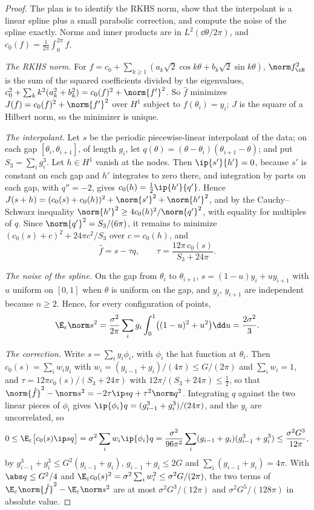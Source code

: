 \begin{refsection}
\begin{proof}
The plan is to identify the RKHS norm, show that the interpolant is a linear spline plus a small parabolic correction, and compute the noise of the spline exactly. Norms and inner products are in $L^2(\dd\theta/2\pi)$, and $c_0(f)=\frac1{2\pi}\int_0^{2\pi}f$.

\emph{The RKHS norm.} For $f=c_0+\sum_{k\ge1}(a_k\sqrt2\cos k\theta+b_k\sqrt2\sin k\theta)$, $\norm f_\cH^2$ is the sum of the squared coefficients divided by the eigenvalues, $c_0^2+\sum_kk^2(a_k^2+b_k^2)=c_0(f)^2+\norm{f'}^2$. So $\hat f$ minimizes $J(f)=c_0(f)^2+\norm{f'}^2$ over $H^1$ subject to $f(\theta_i)=y_i$; $J$ is the square of a Hilbert norm, so the minimizer is unique.

\emph{The interpolant.} Let $s$ be the periodic piecewise-linear interpolant of the data; on each gap $[\theta_i,\theta_{i+1}]$, of length $g_i$, let $q(\theta)=(\theta-\theta_i)(\theta_{i+1}-\theta)$; and put $S_3=\sum_ig_i^3$. Let $h\in H^1$ vanish at the nodes. Then $\ip{s'}{h'}=0$, because $s'$ is constant on each gap and $h'$ integrates to zero there, and integration by parts on each gap, with $q''=-2$, gives $c_0(h)=\frac12\ip{h'}{q'}$. Hence $J(s+h)=(c_0(s)+c_0(h))^2+\norm{s'}^2+\norm{h'}^2$, and by the Cauchy--Schwarz inequality $\norm{h'}^2\ge4c_0(h)^2/\norm{q'}^2$, with equality for multiples of $q$. Since $\norm{q'}^2=S_3/(6\pi)$, it remains to minimize $(c_0(s)+c)^2+24\pi c^2/S_3$ over $c=c_0(h)$, and
\[
\hat f=s-\tau q,\qquad\tau=\frac{12\pi\,c_0(s)}{S_3+24\pi}.
\]

\emph{The noise of the spline.} On the gap from $\theta_i$ to $\theta_{i+1}$, $s=(1-u)y_i+uy_{i+1}$ with $u$ uniform on $[0,1]$ when $\theta$ is uniform on the gap, and $y_i$, $y_{i+1}$ are independent because $n\ge2$. Hence, for every configuration of points,
\[
\E_\varepsilon\norm s^2=\frac{\sigma^2}{2\pi}\sum_ig_i\int_0^1\bigl((1-u)^2+u^2\bigr)\dd u=\frac{2\sigma^2}3 .
\]

\emph{The correction.} Write $s=\sum_iy_i\phi_i$, with $\phi_i$ the hat function at $\theta_i$. Then $c_0(s)=\sum_iw_iy_i$ with $w_i=(g_{i-1}+g_i)/(4\pi)\le G/(2\pi)$ and $\sum_iw_i=1$, and $\tau=12\pi c_0(s)/(S_3+24\pi)$ with $12\pi/(S_3+24\pi)\le\frac12$, so that $\norm{\hat f}^2-\norm s^2=-2\tau\ip sq+\tau^2\norm q^2$. Integrating $q$ against the two linear pieces of $\phi_i$ gives $\ip{\phi_i}q=(g_{i-1}^3+g_i^3)/(24\pi)$, and the $y_i$ are uncorrelated, so
\[
0\le\E_\varepsilon\bigl[c_0(s)\ip sq\bigr]=\sigma^2\sum_iw_i\ip{\phi_i}q=\frac{\sigma^2}{96\pi^2}\sum_i(g_{i-1}+g_i)(g_{i-1}^3+g_i^3)\le\frac{\sigma^2G^3}{12\pi},
\]
by $g_{i-1}^3+g_i^3\le G^2(g_{i-1}+g_i)$, $g_{i-1}+g_i\le2G$ and $\sum_i(g_{i-1}+g_i)=4\pi$. With $\abs q\le G^2/4$ and $\E_\varepsilon c_0(s)^2=\sigma^2\sum_iw_i^2\le\sigma^2G/(2\pi)$, the two terms of $\E_\varepsilon\norm{\hat f}^2-\E_\varepsilon\norm s^2$ are at most $\sigma^2G^3/(12\pi)$ and $\sigma^2G^5/(128\pi)$ in absolute value.


\end{proof}
\end{refsection}
